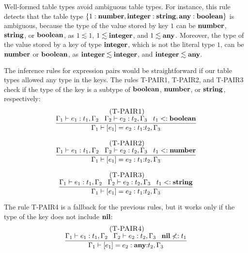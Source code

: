 Well-formed table types avoid ambiguous table types.
For instance, this rule detects that the table type
$\{1:\mathbf{number}, \mathbf{integer}:\mathbf{string}, \mathbf{any}:\mathbf{boolean}\}$ is ambiguous,
because the type of the value stored by key $1$ can be
$\mathbf{number}$, $\mathbf{string}$, or $\mathbf{boolean}$, as $1 \lesssim 1$,
$1 \lesssim \mathbf{integer}$, and $1 \lesssim \mathbf{any}$.
Moreover, the type of the value stored by a key of type $\mathbf{integer}$,
which is not the literal type $1$, can be $\mathbf{number}$ or $\mathbf{boolean}$,
as $\mathbf{integer} \lesssim \mathbf{integer}$, and $\mathbf{integer} \lesssim \mathbf{any}$.

The inference rules for expression pairs would be straightforward
if our table types allowed any type in the keys.
The rules \textsc{T-PAIR1}, \textsc{T-PAIR2}, and \textsc{T-PAIR3}
check if the type of the key is a subtype of $\mathbf{boolean}$, $\mathbf{number}$,
or $\mathbf{string}$, respectively:
\[
\begin{array}{c}
\begin{array}{c}
\; (\textsc{T-PAIR1})\\
\dfrac{\Gamma_{1} \vdash e_{1}:t_{1}, \Gamma_{2} \;\;\;
       \Gamma_{2} \vdash e_{2}:t_{2}, \Gamma_{3} \;\;\;
       t_{1} <: \mathbf{boolean}}
      {\Gamma_{1} \vdash [e_{1}] = e_{2}: t_{1}{:}t_{2}, \Gamma_{3}}
\end{array}
\\ \\
\begin{array}{c}
\; (\textsc{T-PAIR2})\\
\dfrac{\Gamma_{1} \vdash e_{1}:t_{1}, \Gamma_{2} \;\;\;
       \Gamma_{2} \vdash e_{2}:t_{2}, \Gamma_{3} \;\;\;
       t_{1} <: \mathbf{number}}
      {\Gamma_{1} \vdash [e_{1}] = e_{2}: t_{1}{:}t_{2}, \Gamma_{3}}
\end{array}
\\ \\
\begin{array}{c}
\; (\textsc{T-PAIR3})\\
\dfrac{\Gamma_{1} \vdash e_{1}:t_{1}, \Gamma_{2} \;\;\;
       \Gamma_{2} \vdash e_{2}:t_{2}, \Gamma_{3} \;\;\;
       t_{1} <: \mathbf{string}}
      {\Gamma_{1} \vdash [e_{1}] = e_{2}: t_{1}{:}t_{2}, \Gamma_{3}}
\end{array}
\end{array}
\]

The rule \textsc{T-PAIR4} is a fallback for the previous rules,
but it works only if the type of the key does not include $\mathbf{nil}$:
\[
\begin{array}{c}
\; (\textsc{T-PAIR4})\\
\dfrac{\Gamma_{1} \vdash e_{1}:t_{1}, \Gamma_{2} \;\;\;
       \Gamma_{2} \vdash e_{2}:t_{2}, \Gamma_{3} \;\;\;
       \mathbf{nil} \not<: t_{1}}
      {\Gamma_{1} \vdash [e_{1}] = e_{2}: \mathbf{any}{:}t_{2}, \Gamma_{3}}
\end{array}
\]

